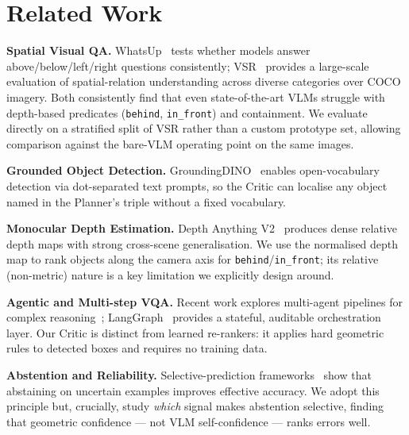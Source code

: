 \documentclass[10pt,twocolumn,letterpaper]{article}
\newcommand{\rel}[1]{\texttt{#1}}
\begin{document}
\section{Related Work}
\textbf{Spatial Visual QA.} WhatsUp~\cite{whatsup} tests whether models answer
above/below/left/right questions consistently; VSR~\cite{vsr} provides a
large-scale evaluation of spatial-relation understanding across diverse
categories over COCO imagery. Both consistently find that even
state-of-the-art VLMs struggle with depth-based predicates (\rel{behind},
\rel{in\_front}) and containment. We evaluate directly on a stratified split
of VSR rather than a custom prototype set, allowing comparison against the
bare-VLM operating point on the same images.

\textbf{Grounded Object Detection.} GroundingDINO~\cite{gdino} enables
open-vocabulary detection via dot-separated text prompts, so the Critic can
localise any object named in the Planner's triple without a fixed vocabulary.

\textbf{Monocular Depth Estimation.} Depth Anything V2~\cite{depthanything}
produces dense relative depth maps with strong cross-scene generalisation. We
use the normalised depth map to rank objects along the camera axis for
\rel{behind}/\rel{in\_front}; its relative (non-metric) nature is a key
limitation we explicitly design around.

\textbf{Agentic and Multi-step VQA.} Recent work explores multi-agent
pipelines for complex reasoning~\cite{llava}; LangGraph~\cite{langgraph}
provides a stateful, auditable orchestration layer. Our Critic is distinct
from learned re-rankers: it applies hard geometric rules to detected boxes and
requires no training data.

\textbf{Abstention and Reliability.} Selective-prediction
frameworks~\cite{selective} show that abstaining on uncertain examples
improves effective accuracy. We adopt this principle but, crucially, study
\emph{which} signal makes abstention selective, finding that geometric
confidence --- not VLM self-confidence --- ranks errors well.
\end{document}
